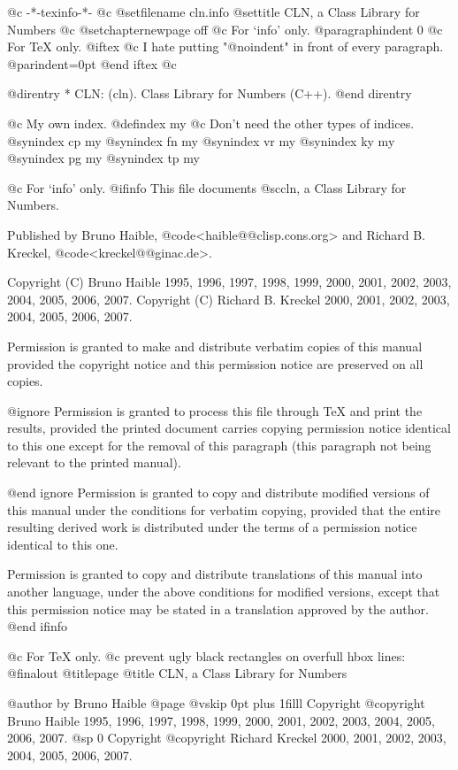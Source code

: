  @c -*-texinfo-*-
@c %
@setfilename cln.info
@settitle CLN, a Class Library for Numbers
@c @setchapternewpage off
@c For `info' only.
@paragraphindent 0
@c For TeX only.
@iftex
@c I hate putting "@noindent" in front of every paragraph.
@parindent=0pt
@end iftex
@c %

@direntry
* CLN: (cln).                       Class Library for Numbers (C++).
@end direntry

@c My own index.
@defindex my
@c Don't need the other types of indices.
@synindex cp my
@synindex fn my
@synindex vr my
@synindex ky my
@synindex pg my
@synindex tp my


@c For `info' only.
@ifinfo
This file documents @sc{cln}, a Class Library for Numbers.

Published by Bruno Haible, @code{<haible@@clisp.cons.org>} and
Richard B. Kreckel, @code{<kreckel@@ginac.de>}.

Copyright (C)  Bruno Haible 1995, 1996, 1997, 1998, 1999, 2000, 2001, 2002, 2003, 2004, 2005, 2006, 2007.
Copyright (C)  Richard B. Kreckel 2000, 2001, 2002, 2003, 2004, 2005, 2006, 2007.

Permission is granted to make and distribute verbatim copies of
this manual provided the copyright notice and this permission notice
are preserved on all copies.

@ignore
Permission is granted to process this file through TeX and print the
results, provided the printed document carries copying permission
notice identical to this one except for the removal of this paragraph
(this paragraph not being relevant to the printed manual).

@end ignore
Permission is granted to copy and distribute modified versions of this
manual under the conditions for verbatim copying, provided that the entire
resulting derived work is distributed under the terms of a permission
notice identical to this one.

Permission is granted to copy and distribute translations of this manual
into another language, under the above conditions for modified versions,
except that this permission notice may be stated in a translation approved
by the author.
@end ifinfo


@c For TeX only.
@c prevent ugly black rectangles on overfull hbox lines:
@finalout
@titlepage
@title CLN, a Class Library for Numbers

@author by Bruno Haible
@page
@vskip 0pt plus 1filll
Copyright @copyright{} Bruno Haible 1995, 1996, 1997, 1998, 1999, 2000, 2001, 2002, 2003, 2004, 2005, 2006, 2007.
@sp 0
Copyright @copyright{} Richard Kreckel 2000, 2001, 2002, 2003, 2004, 2005, 2006, 2007.

